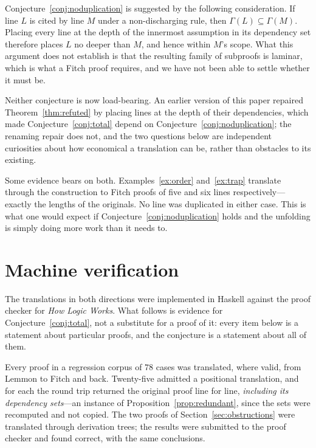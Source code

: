 \documentclass[11pt]{article}
\theoremstyle{plain}
\theoremstyle{definition}
\theoremstyle{remark}
\begin{document}
Conjecture~\ref{conj:noduplication} is suggested by the following
consideration. If line $L$ is cited by line $M$ under a non-discharging rule,
then $\Gamma(L) \subseteq \Gamma(M)$. Placing every line at the depth of the
innermost assumption in its dependency set therefore places $L$ no deeper than
$M$, and hence within $M$'s scope. What this argument does not establish is
that the resulting family of subproofs is laminar, which is what a Fitch proof
requires, and we have not been able to settle whether it must be.

Neither conjecture is now load-bearing. An earlier version of this paper
repaired Theorem~\ref{thm:refuted} by placing lines at the depth of their
dependencies, which made Conjecture~\ref{conj:total} depend on
Conjecture~\ref{conj:noduplication}; the renaming repair does not, and the two
questions below are independent curiosities about how economical a translation
can be, rather than obstacles to its existing.

Some evidence bears on both. Examples~\ref{ex:order} and~\ref{ex:trap}
translate through the construction to Fitch proofs of five and six lines
respectively---exactly the lengths of the originals. No line was duplicated in
either case. This is what one would expect if
Conjecture~\ref{conj:noduplication} holds and the unfolding is simply doing
more work than it needs to.

\section{Machine verification}\label{sec:machine}

The translations in both directions were implemented in Haskell against the
proof checker for \emph{How Logic Works}. What follows is evidence for
Conjecture~\ref{conj:total}, not a substitute for a proof of it: every item
below is a statement about particular proofs, and the conjecture is a
statement about all of them.

Every proof in a regression corpus of $78$ cases was translated, where valid,
from Lemmon to Fitch and back. Twenty-five admitted a positional translation,
and for each the round trip returned the original proof line for line,
\emph{including its dependency sets}---an instance of
Proposition~\ref{prop:redundant}, since the sets were recomputed and not
copied. The two proofs of Section~\ref{sec:obstructions} were translated
through derivation trees; the results were submitted to the proof checker and
found correct, with the same conclusions.
\end{document}
